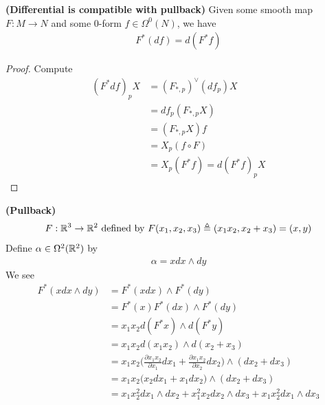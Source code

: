 \documentclass{report}
\begin{document}
\begin{theorem}
\label{Dic}
\textbf{(Differential is compatible with pullback)} Given some smooth map $F:M\rightarrow N$ and some 0-form $f\in \Omega^0(N)$, we have 
\begin{align*}
  F^*(df)=d(F^*f)
\end{align*}
\end{theorem}
\begin{proof}
Compute 
\begin{align*}
  (F^*df)_p X&= (F_{*,p})^{\vee} (df_p)X \\
  &= df_p (F_{*,p} X) \\
  &=(F_{*,p}X)f\\
  &=X_p (f \circ F) \\
  &=X_p(F^*f)=d(F^*f)_pX
\end{align*}
\end{proof}
\begin{Example}{\textbf{(Pullback)}}{}
\begin{align*}
F:\mathbb{R}^3\rightarrow \mathbb{R}^2\text{ defined by }F(x_1,x_2,x_3)\triangleq (x_1x_2,x_2+x_3)=(x,y)
\end{align*}
Define $\alpha \in \Omega^2(\mathbb{R}^2)$ by 
\begin{align*}
\alpha =xdx\wedge  dy 
\end{align*}
We see  
\begin{align*}
F^*(xdx\wedge  dy)&=F^*(xdx)\wedge   F^*(dy)\\
&=F^*(x)F^*(dx)\wedge  F^*(dy) \\
&=x_1x_2d(F^*x)\wedge   d(F^*y)\\
&=x_1x_2d(x_1x_2)\wedge   d(x_2+x_3) \\
&=x_1x_2\Big(\frac{\partial x_1x_2}{\partial x_1}dx_1 + \frac{\partial x_1x_2}{\partial x_2}dx_2 \Big)\wedge (dx_2+dx_3)  \\
&=x_1x_2\Big(x_2dx_1 + x_1dx_2 \Big)\wedge (dx_2+dx_3)  \\
&= x_1x_2^2 dx_1 \wedge  dx_2  + x_1^2 x_2 dx_2 \wedge  dx_3 + x_1x_2^2 dx_1 \wedge   dx_3 
\end{align*}
\end{Example}
\end{document}
